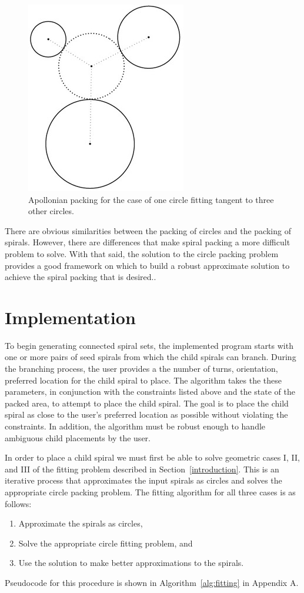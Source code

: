 \documentclass[11pt]{IEEEtran}
\begin{document}
\begin{figure}[h!]
\centering 
\includegraphics[width=0.5\linewidth]{spiral-circles}
\caption{Apollonian packing for the case of one circle fitting tangent to three other circles.\cite{Browne2006834}}
\label{fig:circle}
\end{figure}

There are obvious similarities between the packing of circles and the packing of spirals. However, there are differences that make spiral packing a more difficult problem to solve. With that said, the solution to the circle packing problem provides a good framework on which to build a robust approximate solution to achieve the spiral packing that is desired.\cite{Browne2006834}.


\section{Implementation}
\label{implementation}
To begin generating connected spiral sets, the implemented program starts with one or more pairs of seed spirals from which the child spirals can branch. During the branching process, the user provides a the number of turns, orientation, preferred location for the child spiral to place. The algorithm takes the these parameters, in conjunction with the constraints listed above and the state of the packed area, to attempt to place the child spiral. The goal is to place the child spiral as close to the user's preferred location as possible without violating the constraints. In addition, the algorithm must be robust enough to handle ambiguous child placements by the user.

In order to place a child spiral we must first be able to solve geometric cases I, II, and III of the fitting problem described in Section~\ref{introduction}. This is an iterative process that approximates the input spirals as circles and solves the appropriate circle packing problem. The fitting algorithm for all three cases is as follows:
\begin{enumerate}
	\item Approximate the spirals as circles,
	\item Solve the appropriate circle fitting problem, and
	\item Use the solution to make better approximations to the spirals.
\end{enumerate}
Pseudocode for this procedure is shown in Algorithm~\ref{alg:fitting} in Appendix A. 
	
\end{document}
